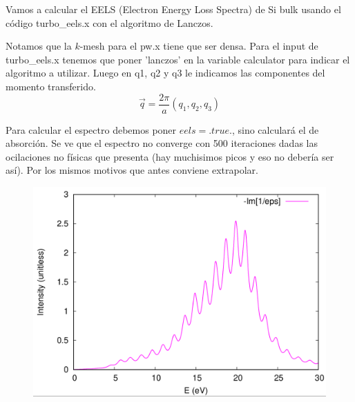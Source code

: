   Vamos a calcular el EELS (Electron Energy Loss Spectra) de Si bulk usando el código turbo\_eels.x con el algoritmo de Lanczos.


  Notamos que la $k$-mesh para el pw.x tiene que ser densa. Para el input de turbo\_eels.x tenemos que poner 'lanczos' en la variable calculator para indicar el algoritmo a utilizar. Luego en q1, q2 y q3 le indicamos las componentes del momento transferido.
    $$\vec{q} = \frac{2\pi}{a} \left(q_1, q_2, q_3\right)$$

  Para calcular el espectro debemos poner $eels = .true.$, sino calculará el de absorción. Se ve que el espectro no converge con 500 iteraciones dadas las ocilaciones no físicas que presenta (hay muchisimos picos y eso no debería ser así). Por los mismos motivos que antes conviene extrapolar.
    \begin{figure}[H]
        \centering
        \includegraphics[scale = 0.30]{figs/D6/EELS_L_500.png}
    \end{figure}

